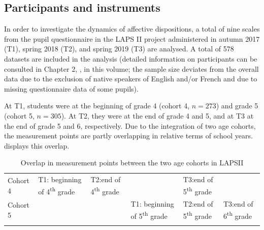 \documentclass[output=paper]{langsci/langscibook}
\begin{document}
\subsection{Participants and instruments}

In order to investigate the dynamics of affective dispositions, a total of nine scales from the pupil questionnaire in the LAPS II project administered in autumn 2017 (T1), spring 2018 (T2), and spring 2019 (T3) are analysed. A total of 578 datasets are included in the analysis (detailed information on participants can be consulted in Chapter 2, , in this volume; the sample size deviates from the overall data due to the exclusion of native speakers of English and/or French and due to missing questionnaire data of some pupils). 

At T1, students were at the beginning of grade 4 (cohort 4, $n=273$) and grade 5 (cohort 5, $n=305$). At T2, they were at the end of grade 4 and 5, and at T3 at the end of grade 5 and 6, respectively. Due to the integration of two age cohorts, the measurement points are partly overlapping in relative terms of school years.  displays this overlap.

\begin{table}\small
\begin{tabularx}{\textwidth}{lQQQQQ}
\lsptoprule
Cohort 4 & T1: beginning of 4\textsuperscript{th} grade & T2:\newline end of 4\textsuperscript{th} grade &   & T3:\newline end of 5\textsuperscript{th}   grade &    \\
Cohort 5 &    &   & T1: beginning of 5\textsuperscript{th} grade & T2:\newline end of 5\textsuperscript{th}   grade & T3:\newline end of 6\textsuperscript{th} grade\\\lspbottomrule
\end{tabularx}
\caption{\label{bkm:Ref32572945}\label{tab:08:1}Overlap in measurement points between the two age cohorts in LAPSII}
\end{table}
\end{document}
